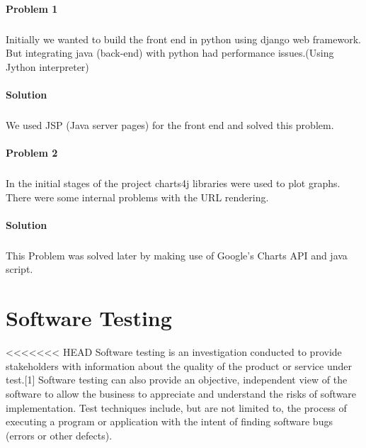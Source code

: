 \documentclass[12pt]{report}
\begin{document}
\subsubsection{Problem 1}
\paragraph{}Initially we wanted to build the front end in python using django web framework. But integrating java (back-end) with python had performance issues.(Using Jython interpreter)
\subsubsection{Solution}
\paragraph{}We used JSP (Java server pages) for the front end and solved this problem.
\subsubsection{Problem 2}
\paragraph{}In the initial stages of the project charts4j libraries were used to plot graphs. There were some internal problems with the URL rendering.

\subsubsection{Solution}
\paragraph{}This Problem was solved later by making use of Google's Charts API and java script. 


\pagebreak






\pagestyle{fancy}
\chead{}
\rfoot{\small{\thepage}}
\renewcommand{\headrulewidth}{0.4pt}
\renewcommand{\footrulewidth}{0.4pt}
\chapter{Software Testing}
<<<<<<< HEAD
Software testing is an investigation conducted to provide stakeholders with information about the quality of the product or service under test.[1] Software testing can also provide an objective, independent view of the software to allow the business to appreciate and understand the risks of software implementation. Test techniques include, but are not limited to, the process of executing a program or application with the intent of finding software bugs (errors or other defects).
\end{document}
